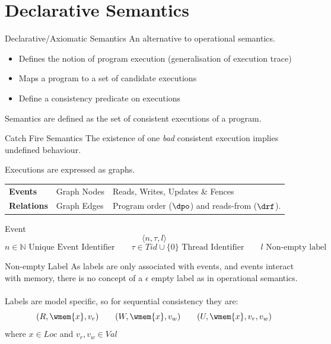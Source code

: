 \chapter{Declarative Semantics}

\begin{definitionbox}{Declarative/Axiomatic Semantics}
	An alternative to operational semantics.
	\begin{itemize}
		\item Defines the notion of program execution (generalisation of execution trace)
		\item Maps a program to a set of candidate executions
		\item Define a consistency predicate on executions
	\end{itemize}
	Semantics are defined as the set of consistent executions of a program.
\end{definitionbox}
\begin{definitionbox}{Catch Fire Semantics}
	The existence of one \textit{bad} consistent execution implies undefined behaviour.
\end{definitionbox}
Executions are expressed as graphs.
\begin{center}
	\begin{tabular}{l l p{}}
		\textbf{Events}    & Graph Nodes & Reads, Writes, Updates \& Fences                \\
		\textbf{Relations} & Graph Edges & Program order ($\dpo$) and reads-from ($\drf$). \\
	\end{tabular}
\end{center}

\begin{definitionbox}{Event}
	\[\langle n, \tau, l \rangle\]
	\[
		n \in \mathbb{N}  \text{ Unique Event Identifier} \qquad
		\tau \in Tid \cup \{0\}  \text{ Thread Identifier} \qquad
		l \text{ Non-empty label}
	\]
\end{definitionbox}
\begin{definitionbox}{Non-empty Label}
	As labels are only associated with events, and events interact with memory, there is no concept of a $\epsilon$ empty label as in operational semantics.
	\\
	\\ Labels are model specific, so for sequential consistency they are:
	\[(R, \wmem{x}, v_r) \qquad (W, \wmem{x}, v_w) \qquad (U, \wmem{x}, v_r, v_w)\]
	where $x \in Loc$ and $v_r, v_w \in Val$
\end{definitionbox}

